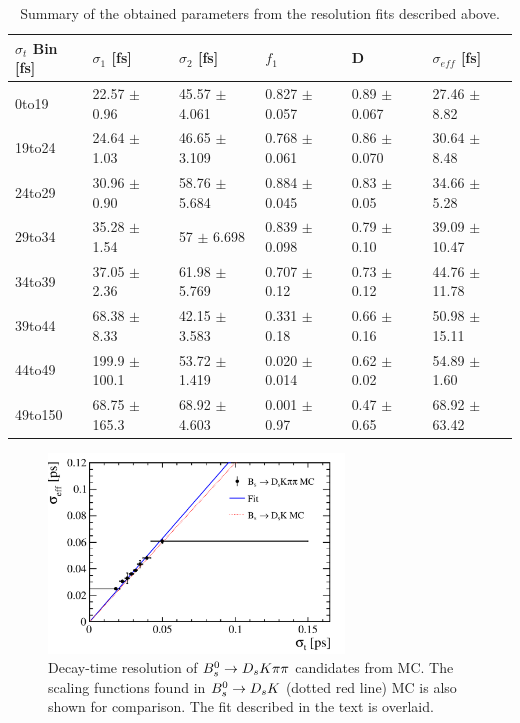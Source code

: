 \begin{table}[h]
\centering
 \begin{tabular}{l || l l l | l l}
$\sigma_{t}$ Bin [fs] & $\sigma_{1}$ [fs] & $\sigma_{2}$ [fs] & $f_{1}$ & D & $\sigma_{eff}$ [fs] \\
\hline
0to19 & 22.57 $\pm$ 0.96 & 45.57 $\pm$ 4.061 & 0.827 $\pm$ 0.057 & 0.89 $\pm$ 0.067 & 27.46 $\pm$ 8.82 \\
19to24 & 24.64 $\pm$ 1.03 & 46.65 $\pm$ 3.109 & 0.768 $\pm$ 0.061 & 0.86 $\pm$ 0.070 & 30.64 $\pm$ 8.48 \\
24to29 & 30.96 $\pm$ 0.90 & 58.76 $\pm$ 5.684 & 0.884 $\pm$ 0.045 & 0.83 $\pm$ 0.05 & 34.66 $\pm$ 5.28 \\
29to34 & 35.28 $\pm$ 1.54 & 57 $\pm$ 6.698 & 0.839 $\pm$ 0.098 & 0.79 $\pm$ 0.10 & 39.09 $\pm$ 10.47 \\
34to39 & 37.05 $\pm$ 2.36 & 61.98 $\pm$ 5.769 & 0.707 $\pm$ 0.12 & 0.73 $\pm$ 0.12 & 44.76 $\pm$ 11.78 \\
39to44 & 68.38 $\pm$ 8.33 & 42.15 $\pm$ 3.583 & 0.331 $\pm$ 0.18 & 0.66 $\pm$ 0.16 & 50.98 $\pm$ 15.11 \\
44to49 & 199.9 $\pm$ 100.1 & 53.72 $\pm$ 1.419 & 0.020 $\pm$ 0.014 & 0.62 $\pm$ 0.02 & 54.89 $\pm$ 1.60 \\
49to150 & 68.75 $\pm$ 165.3 & 68.92 $\pm$ 4.603 & 0.001 $\pm$ 0.97 & 0.47 $\pm$ 0.65 & 68.92 $\pm$ 63.42 \\
\hline
\end{tabular}
\caption{Summary of the obtained parameters from the resolution fits described above.}
\label{table:ResoParams}
\end{table}


\begin{figure}[h]
\centering
\includegraphics[height=!,width=0.7\textwidth]{figs/Resolution/ProperTimeReso_MC.pdf}
\caption{Decay-time resolution of ${{B}^0_{s}}\rightarrow{\ensuremath{{D}_{s}}}{\ensuremath{K}}{\ensuremath{\pi}}{\ensuremath{\pi}}$ candidates from MC. 
The scaling functions found in ${{B}^0_{s}}\rightarrow{\ensuremath{{D}_{s}}}{\ensuremath{K}}$ (dotted red line) MC is also shown for comparison. The fit described in the text is overlaid.}
\label{fig:ResoFit_compared}
\end{figure}




